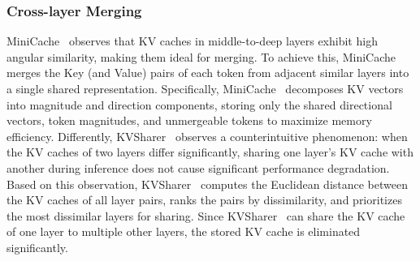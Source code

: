 \subsubsection{Cross-layer Merging}\label{sssec:kv_merge_cross_layer}
MiniCache~\cite{DBLP:journals/corr/abs-2405-14366} observes that KV caches in middle-to-deep layers exhibit high angular similarity, making them ideal for merging. 
To achieve this, MiniCache~\cite{DBLP:journals/corr/abs-2405-14366} merges the Key (and Value) pairs of each token from adjacent similar layers into a single shared representation. Specifically,  MiniCache~\cite{DBLP:journals/corr/abs-2405-14366}  decomposes KV vectors into magnitude and direction components, storing only the shared directional vectors, token magnitudes, and unmergeable tokens to maximize memory efficiency.
Differently,
KVSharer~\cite{yang2024kvsharerefficientinferencelayerwise} observes a counterintuitive phenomenon: when the KV caches of two layers differ significantly, sharing one layer's KV cache with another during inference does not cause significant performance degradation. Based on this observation, 
KVSharer~\cite{yang2024kvsharerefficientinferencelayerwise} computes the Euclidean distance between the KV caches of all layer pairs, ranks the pairs by dissimilarity, and prioritizes the most dissimilar layers for sharing.
Since KVSharer~\cite{yang2024kvsharerefficientinferencelayerwise} can share the KV cache of one layer to multiple other layers, the stored KV cache is eliminated significantly.



